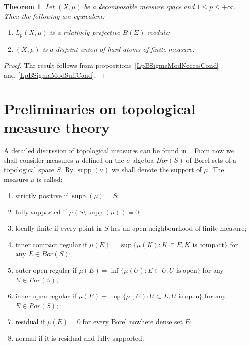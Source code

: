 \documentclass[12pt]{article}
\newtheorem{theorem}{Theorem}[section]
\begin{document}
\begin{theorem}\label{LpBSigmaModCrit} Let $(X,\mu)$ be a decomposable measure
    space and $1\leq p\leq +\infty$. Then the following are equivalent:
    \begin{enumerate}[label = (\roman*)]
        \item $L_p(X,\mu)$ is a relatively projective $B(\Sigma)$-module;

        \item $(X,\mu)$ is a disjoint union of hard atoms of finite measure.
    \end{enumerate}
\end{theorem}
\begin{proof} The result follows from propositions~\ref{LpBSigmaModNecessCond}
    and~\ref{LpBSigmaModSuffCond}.
\end{proof}


\section{Preliminaries on topological measure
  theory}\label{SectionPreliminariesOnTopologicalMeasureTheory}

A detailed discussion of topological measures can be found
in~\cite{FremMeasTh4.1}. From now we shall consider measures $\mu$ defined on
the $\sigma$-algebra $Bor(S)$ of Borel sets of a topological space $S$. By
$\operatorname{supp}(\mu)$ we shall denote the support of $\mu$. The measure
$\mu$ is called:
\begin{enumerate}[label = (\roman*)]
    \item strictly positive if $\operatorname{supp}(\mu)=S$;

    \item fully supported if $\mu(S\setminus\operatorname{supp}(\mu))=0$;

    \item locally finite if every point in $S$ has an open neighbourhood of
          finite measure;

    \item inner compact regular if $\mu(E)=\sup \{\mu(K): K\subset E, K\mbox{ is
                  compact}\}$ for any $E\in Bor(S)$;

    \item outer open regular if $\mu(E)=\inf \{\mu(U): E\subset U, U\mbox{ is
                  open}\}$ for any $E\in Bor(S)$;

    \item inner open regular if $\mu(E)=\sup \{\mu(U): U\subset E, U\mbox{ is
                  open}\}$ for any $E\in Bor(S)$;

    \item residual if $\mu(E)=0$ for every Borel nowhere dense set $E$;

    \item normal if it is residual and fully supported.
\end{enumerate}
\end{document}

